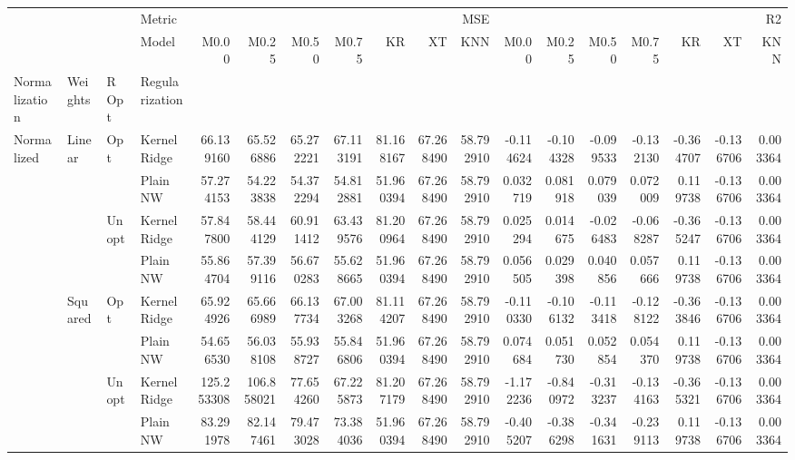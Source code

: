 \begin{tabular}{llllrrrrrrrrrrrrrr}
\toprule
 &  &  & Metric & \multicolumn{7}{r}{MSE} & \multicolumn{7}{r}{R2} \\
 &  &  & Model & M0.00 & M0.25 & M0.50 & M0.75 & KR & XT & KNN & M0.00 & M0.25 & M0.50 & M0.75 & KR & XT & KNN \\
Normalization & Weights & R Opt & Regularization &  &  &  &  &  &  &  &  &  &  &  &  &  &  \\
\midrule
\multirow[t]{8}{*}{Normalized} & \multirow[t]{4}{*}{Linear} & \multirow[t]{2}{*}{Opt} & KernelRidge & 66.139160 & 65.526886 & 65.272221 & 67.113191 & 81.168167 & 67.268490 & 58.792910 & -0.114624 & -0.104328 & -0.099533 & -0.132130 & -0.364707 & -0.136706 & 0.003364 \\
 &  &  & Plain NW & 57.274153 & 54.223838 & 54.372294 & 54.812881 & 51.960394 & 67.268490 & 58.792910 & 0.032719 & 0.081918 & 0.079039 & 0.072009 & 0.119738 & -0.136706 & 0.003364 \\
\cline{3-18}
 &  & \multirow[t]{2}{*}{Unopt} & KernelRidge & 57.847800 & 58.444129 & 60.911412 & 63.439576 & 81.200964 & 67.268490 & 58.792910 & 0.025294 & 0.014675 & -0.026483 & -0.068287 & -0.365247 & -0.136706 & 0.003364 \\
 &  &  & Plain NW & 55.864704 & 57.399116 & 56.670283 & 55.628665 & 51.960394 & 67.268490 & 58.792910 & 0.056505 & 0.029398 & 0.040856 & 0.057666 & 0.119738 & -0.136706 & 0.003364 \\
\cline{2-18} \cline{3-18}
 & \multirow[t]{4}{*}{Squared} & \multirow[t]{2}{*}{Opt} & KernelRidge & 65.924926 & 65.666989 & 66.137734 & 67.003268 & 81.114207 & 67.268490 & 58.792910 & -0.110330 & -0.106132 & -0.113418 & -0.128122 & -0.363846 & -0.136706 & 0.003364 \\
 &  &  & Plain NW & 54.656530 & 56.038108 & 55.938727 & 55.846806 & 51.960394 & 67.268490 & 58.792910 & 0.074684 & 0.051730 & 0.052854 & 0.054370 & 0.119738 & -0.136706 & 0.003364 \\
\cline{3-18}
 &  & \multirow[t]{2}{*}{Unopt} & KernelRidge & 125.253308 & 106.858021 & 77.654260 & 67.225873 & 81.207179 & 67.268490 & 58.792910 & -1.172236 & -0.840972 & -0.313237 & -0.134163 & -0.365321 & -0.136706 & 0.003364 \\
 &  &  & Plain NW & 83.291978 & 82.147461 & 79.473028 & 73.384036 & 51.960394 & 67.268490 & 58.792910 & -0.405207 & -0.386298 & -0.341631 & -0.239113 & 0.119738 & -0.136706 & 0.003364 \\
\cline{1-18} \cline{2-18} \cline{3-18}
\bottomrule
\end{tabular}
